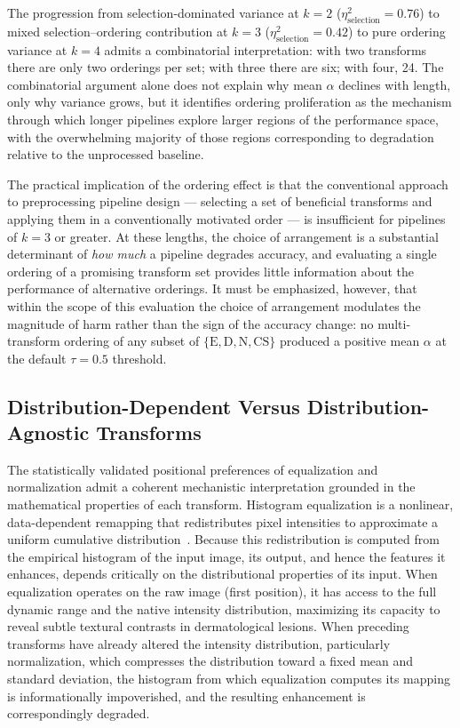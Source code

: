 \documentclass[preprint,5p,times,twocolumn]{elsarticle}
\begin{document}
The progression from selection-dominated variance at $k=2$ ($\eta^2_{\text{selection}} = 0.76$) to mixed selection--ordering contribution at $k=3$ ($\eta^2_{\text{selection}} = 0.42$) to pure ordering variance at $k=4$ admits a combinatorial interpretation: with two transforms there are only two orderings per set; with three there are six; with four, 24. The combinatorial argument alone does not explain why mean $\alpha$ declines with length, only why variance grows, but it identifies ordering proliferation as the mechanism through which longer pipelines explore larger regions of the performance space, with the overwhelming majority of those regions corresponding to degradation relative to the unprocessed baseline.

The practical implication of the ordering effect is that the conventional approach to preprocessing pipeline design --- selecting a set of beneficial transforms and applying them in a conventionally motivated order --- is insufficient for pipelines of $k=3$ or greater. At these lengths, the choice of arrangement is a substantial determinant of \emph{how much} a pipeline degrades accuracy, and evaluating a single ordering of a promising transform set provides little information about the performance of alternative orderings. It must be emphasized, however, that within the scope of this evaluation the choice of arrangement modulates the magnitude of harm rather than the sign of the accuracy change: no multi-transform ordering of any subset of $\{\text{E}, \text{D}, \text{N}, \text{CS}\}$ produced a positive mean $\alpha$ at the default $\tau = 0.5$ threshold.

\subsection{Distribution-Dependent Versus Distribution-Agnostic Transforms}

The statistically validated positional preferences of equalization and normalization admit a coherent mechanistic interpretation grounded in the mathematical properties of each transform. Histogram equalization is a nonlinear, data-dependent remapping that redistributes pixel intensities to approximate a uniform cumulative distribution~\cite{Pizer1987}. Because this redistribution is computed from the empirical histogram of the input image, its output, and hence the features it enhances, depends critically on the distributional properties of its input. When equalization operates on the raw image (first position), it has access to the full dynamic range and the native intensity distribution, maximizing its capacity to reveal subtle textural contrasts in dermatological lesions. When preceding transforms have already altered the intensity distribution, particularly normalization, which compresses the distribution toward a fixed mean and standard deviation, the histogram from which equalization computes its mapping is informationally impoverished, and the resulting enhancement is correspondingly degraded.
\end{document}
